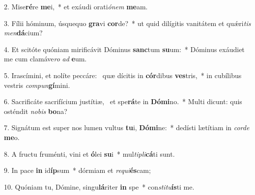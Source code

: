 2. Mise\textbf{ré}re \textbf{me}i,~*  et exáudi orati\textit{ó}\textit{nem} \textbf{me}am.\

3. Fílii hóminum, úsquequo \textbf{gra}vi \textbf{cor}de?~*  ut quid dilígitis vanitátem et quǽri\textit{tis} \textit{men}\textbf{dá}cium?\

4. Et scitóte quóniam mirificávit Dóminus \textbf{sanc}tum \textbf{su}um:~*  Dóminus exáudiet me cum clamáve\textit{ro} \textit{ad} \textbf{e}um.\

5. Irascímini, et nolíte peccáre: \dag\  quæ dícitis in \textbf{cór}dibus \textbf{ves}tris,~*  in cubílibus vestris \textit{com}\textit{pun}\textbf{gí}mini.\

6. Sacrificáte sacrifícium justítiæ, \dag\  et spe\textbf{rá}te in \textbf{Dó}\textbf{mi}no.~*  Multi dicunt: quis osténdit \textit{no}\textit{bis} \textbf{bo}na?\

7. Signátum est super nos lumen vultus \textbf{tu}i, \textbf{Dó}\textbf{mi}ne:~*  dedísti lætítiam in \textit{cor}\textit{de} \textbf{me}o.\

8. A fructu fruménti, vini et \textbf{ó}lei \textbf{su}i~*  mul\textit{ti}\textit{pli}\textbf{cá}ti sunt.\

9. In pace \textbf{in} id\textbf{íp}sum~*  dórmiam et \textit{re}\textit{qui}\textbf{és}cam;\

10. Quóniam tu, Dómine, singu\textbf{lá}riter \textbf{in} spe~*  con\textit{sti}\textit{tu}\textbf{ís}ti me.\

